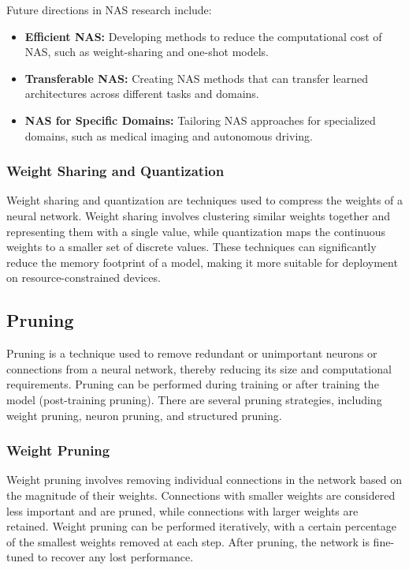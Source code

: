 \documentclass[12pt]{article}
\begin{document}
Future directions in NAS research include:
\begin{itemize}
    \item \textbf{Efficient NAS:} Developing methods to reduce the computational cost of NAS, such as weight-sharing and one-shot models.
    \item \textbf{Transferable NAS:} Creating NAS methods that can transfer learned architectures across different tasks and domains.
    \item \textbf{NAS for Specific Domains:} Tailoring NAS approaches for specialized domains, such as medical imaging and autonomous driving.
\end{itemize}

\subsubsection{Weight Sharing and Quantization}

Weight sharing and quantization are techniques used to compress the weights of a neural network. Weight sharing involves clustering similar weights together and representing them with a single value, while quantization maps the continuous weights to a smaller set of discrete values. These techniques can significantly reduce the memory footprint of a model, making it more suitable for deployment on resource-constrained devices.

\subsection{Pruning}

Pruning is a technique used to remove redundant or unimportant neurons or connections from a neural network, thereby reducing its size and computational requirements. Pruning can be performed during training or after training the model (post-training pruning). There are several pruning strategies, including weight pruning, neuron pruning, and structured pruning.

\subsubsection{Weight Pruning}

Weight pruning involves removing individual connections in the network based on the magnitude of their weights. Connections with smaller weights are considered less important and are pruned, while connections with larger weights are retained. Weight pruning can be performed iteratively, with a certain percentage of the smallest weights removed at each step. After pruning, the network is fine-tuned to recover any lost performance.
\end{document}
